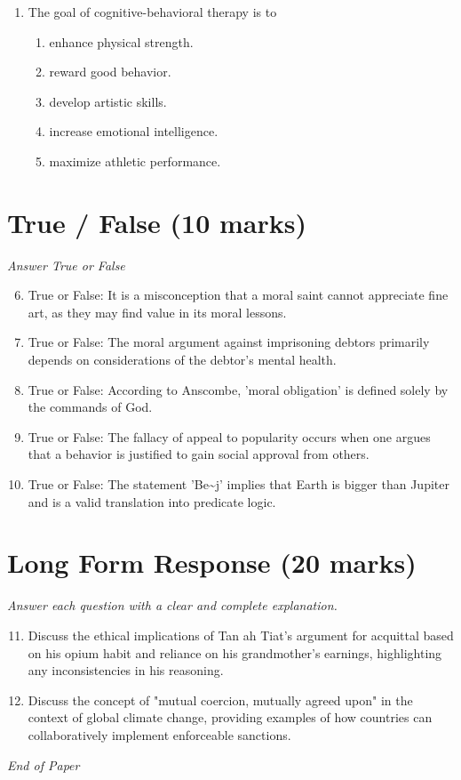 \documentclass[12pt]{article}
\begin{document}
\begin{enumerate}[label=\arabic*.]
\begin{enumerate}[label=(\alph*)]
    \item Vishnu
    \item Shiva
\end{enumerate}
\item The goal of cognitive-behavioral therapy is to
\begin{enumerate}[label=(\alph*)]
    \item enhance physical strength.
    \item reward good behavior.
    \item develop artistic skills.
    \item increase emotional intelligence.
    \item maximize athletic performance.
\end{enumerate}
\end{enumerate}

\section*{True / False (10 marks)}
\textit{Answer True or False}
\begin{enumerate}[label=\arabic*.]
\setcounter{enumi}{5}
\item True or False: It is a misconception that a moral saint cannot appreciate fine art, as they may find value in its moral lessons.
\item True or False: The moral argument against imprisoning debtors primarily depends on considerations of the debtor's mental health.
\item True or False: According to Anscombe, 'moral obligation' is defined solely by the commands of God.
\item True or False: The fallacy of appeal to popularity occurs when one argues that a behavior is justified to gain social approval from others.
\item True or False: The statement 'Be\textasciitilde{}j' implies that Earth is bigger than Jupiter and is a valid translation into predicate logic.
\end{enumerate}

\section*{Long Form Response (20 marks)}
\textit{Answer each question with a clear and complete explanation.}
\begin{enumerate}[label=\arabic*.]
\setcounter{enumi}{10}
\item Discuss the ethical implications of Tan ah Tiat's argument for acquittal based on his opium habit and reliance on his grandmother's earnings, highlighting any inconsistencies in his reasoning.
\item Discuss the concept of "mutual coercion, mutually agreed upon" in the context of global climate change, providing examples of how countries can collaboratively implement enforceable sanctions.
\end{enumerate}

\vfill
\noindent\textit{End of Paper}
\end{document}
